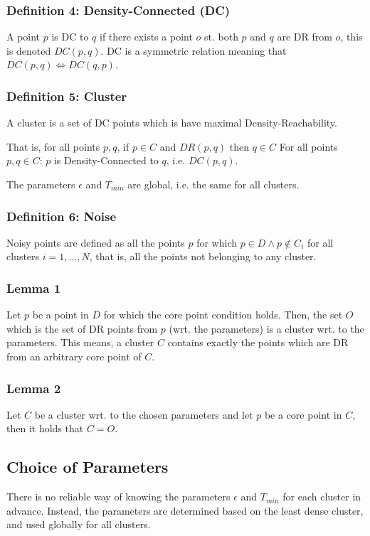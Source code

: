 \subsubsection*{Definition 4: Density-Connected (DC)}
A point $p$ is DC to $q$ if there exists a point $o$ st. both $p$ and $q$ are DR from $o$, this is denoted $DC(p,q)$. DC is a symmetric relation meaning that $DC(p,q) \iff DC(q,p)$.

\subsubsection*{Definition 5: Cluster}
A cluster is a set of DC points which is have maximal Density-Reachability. 

That is, for all points $p,q$, if $p \in C$ and $DR(p,q)$ then $q \in C$
For all points $p,q \in C$: $p$ is Density-Connected to $q$, i.e. $DC(p,q) $.

The parameters $\epsilon$ and $T_{min}$ are global, i.e. the same for all clusters.

\subsubsection*{Definition 6: Noise}
Noisy points are defined as all the points $p$ for which $p \in D \wedge p \notin C_i$ for all clusters $i = 1,...,N$, that is, all the points not belonging to any cluster.

\subsubsection*{Lemma 1}
Let $p$ be a point in $D$ for which the core point condition holds. Then, the set $O$ which is the set of DR points from $p$ (wrt. the parameters) is a cluster wrt. to the parameters. This means, a cluster $C$ contains exactly the points which are DR from an arbitrary core point of $C$.

\subsubsection*{Lemma 2}
Let $C$ be a cluster wrt. to the chosen parameters and let $p$ be a core point in $C$, then it holds that $C = O$.

\subsection{Choice of Parameters}
There is no reliable way of knowing the parameters $\epsilon$ and $T_{min}$ for each cluster in advance. Instead, the parameters are determined based on the least dense cluster, and used globally for all clusters.


